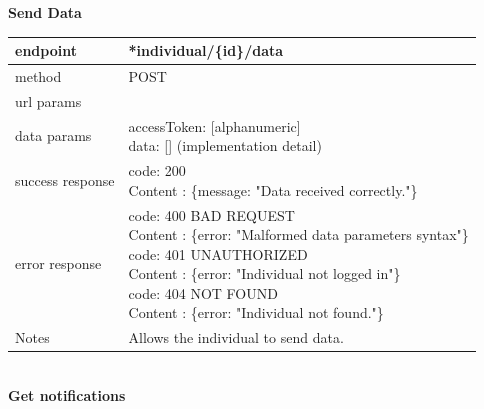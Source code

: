 \begin{legal}
\begin{legal}
\begin{itemize}
								\textbf{Send Data} \\
			
								\begin{tabularx}{\linewidth}{| l| l }
									\hline
									endpoint & *individual/\{id\}/data \\
									\hline
									method & POST \\
									\hline
									url params & \\
									\hline
									data params &
									\parbox{0.7\textwidth}{
										\bigskip
										accessToken: [alphanumeric]\\
										data: [] (implementation detail)\\
										\bigskip
									} \\
									\hline
									success response &
									\parbox{0.7\textwidth}{
										\bigskip
										code: 200\\
										Content : \{message: "Data received correctly."\}
										\bigskip
									} \\
									\hline
									error response &
									\parbox{0.7\textwidth}{
										\bigskip
										code: 400 BAD REQUEST \\
										Content : \{error: "Malformed data parameters syntax"\}\\
										code: 401 UNAUTHORIZED \\
										Content : \{error: "Individual not logged in"\}\\
										code: 404 NOT FOUND \\
										Content : \{error: "Individual not found."\}
										\bigskip
									} \\
									\hline
									Notes & 
									\parbox{0.7\textwidth}{
										\bigskip Allows the individual to send data.
									\bigskip}  \\
									\hline
								\end{tabularx}\\
								
								\textbf{Get notifications} \\
			

\end{itemize}
\end{legal}
\end{legal}
